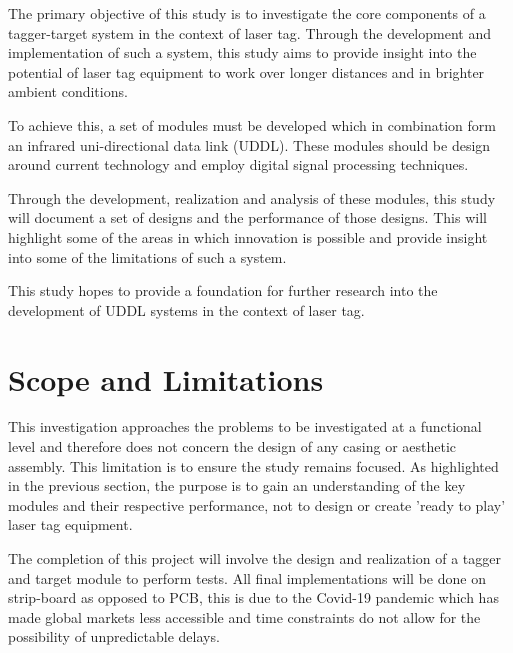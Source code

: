 

The primary objective of this study is to investigate the core components of a tagger-target system in the context of laser tag. Through the development and implementation of such a system, this study aims to provide insight into the potential of laser tag equipment to work over longer distances and in brighter ambient conditions.

To achieve this, a set of modules must be developed which in combination form an infrared uni-directional data link (UDDL). These modules should be design around current technology and employ digital signal processing techniques.

Through the development, realization and analysis of these modules, this study will document a set of designs and the performance of those designs. This will highlight some of the areas in which innovation is possible and provide insight into some of the limitations of such a system.

This study hopes to provide a foundation for further research into the development of UDDL systems in the context of laser tag.



\section{Scope and Limitations}

This investigation approaches the problems to be investigated at a functional level and therefore does not concern the design of any casing or aesthetic assembly. This limitation is to ensure the study remains focused. As highlighted in the previous section, the purpose is to gain an understanding of the key modules and their respective performance, not to design or create 'ready to play' laser tag equipment.

The completion of this project will involve the design and realization of a tagger and target module to perform tests. All final implementations will be done on strip-board as opposed to PCB, this is due to the Covid-19 pandemic which has made global markets less accessible and time constraints do not allow for the possibility of unpredictable delays.

